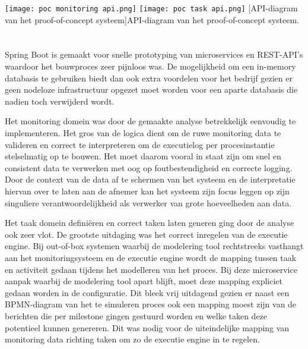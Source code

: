  
\begin{center}
  \captionsetup{type=figure}
  \texttt{[image: poc monitoring api.png]}
  \texttt{[image: poc task api.png]}
  [API-diagram van het proof-of-concept systeem]{API-diagram van het proof-of-concept systeem.}
\end{center}
\section{}%
\label{sec:implementatie}
Spring Boot is gemaakt voor snelle prototyping van microservices en REST-API’s waardoor het bouwproces zeer pijnloos was. De mogelijkheid om een in-memory databasis te gebruiken biedt dan ook extra voordelen voor het bedrijf gezien er geen nodeloze infrastructuur opgezet moet worden voor een aparte databasis die nadien toch verwijderd wordt.\newline

Het monitoring domein was door de gemaakte analyse betrekkelijk eenvoudig te implementeren. Het gros van de logica dient om de ruwe monitoring data te valideren en correct te interpreteren om de executielog per procesinstantie stelselmatig op te bouwen. Het moet daarom vooral in staat zijn om snel en consistent data te verwerken met oog op foutbestendigheid en correcte logging. Door de context van de data af te schermen van het systeem en de interpretatie hiervan over te laten aan de afnemer kan het systeem zijn focus leggen op zijn singuliere verantwoordelijkheid als verwerker van grote hoeveelheden aan data. \newline

Het taak domein definiëren en correct taken laten generen ging door de analyse ook zeer vlot. De grootste uitdaging was het correct inregelen van de executie engine. Bij out-of-box systemen waarbij de modelering tool rechtstreeks vasthangt aan het monitoringsysteem en de executie engine wordt de mapping tussen taak en activiteit gedaan tijdens het modelleren van het proces. Bij deze microservice aanpak waarbij de modelering tool apart blijft, moet deze mapping expliciet gedaan worden in de configuratie. Dit bleek vrij uitdagend gezien er naast een BPMN-diagram van het te simuleren proces ook een mapping moest zijn van de berichten die per milestone gingen gestuurd worden en welke taken deze potentieel kunnen genereren. Dit was nodig voor de uiteindelijke mapping van monitoring data richting taken om zo de executie engine in te regelen. \newline

